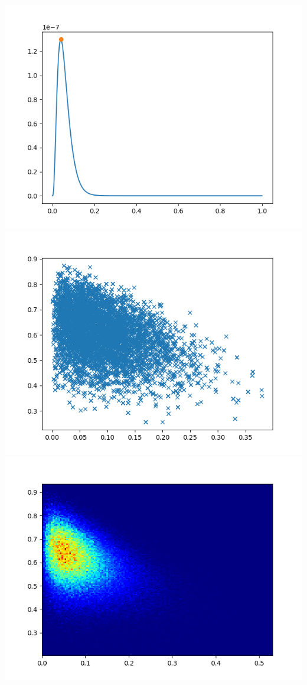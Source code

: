 \documentclass[pt12]{article}
\begin{document}
\newpage

\begin{center}
\includegraphics[scale=0.5]{hip12.png}\\
\includegraphics[scale=0.5]{sc12.png}\\
\includegraphics[scale=0.5]{den12.png}\\
\end{center}
\end{document}
